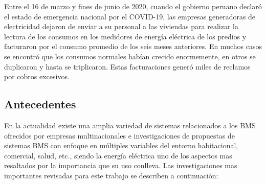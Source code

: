 \documentclass[a4paper, 12pt]{article}
\begin{document}
Entre el 16 de marzo y fines de junio de 2020, cuando el gobierno peruano declaró el estado de emergencia nacional por el COVID-19, las empresas generadoras de electricidad dejaron de enviar a su personal a las viviendas para realizar la lectura de los consumos en los medidores de energía eléctrica de los predios y facturaron por el consumo promedio de los seis meses anteriores. En muchos casos se encontró que los consumos normales habían crecido enormemente, en otros se duplicaron y hasta se triplicaron. Estas facturaciones generó miles de reclamos por cobros excesivos. %


\subsection{Antecedentes}
En la actualidad existe una amplia variedad de sistemas relacionados a los BMS ofrecidos por empresas multinacionales e investigaciones de propuestas de sistemas BMS con enfoque en múltiples variables del entorno habitacional, comercial, salud, etc., siendo la energía eléctrica uno de los aspectos mas resaltados por la importancia que su uso conlleva. Las investigaciones mas importantes revisadas para este trabajo se describen a continuación:
\end{document}
